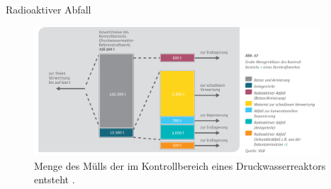 \begin{frame}{Radioaktiver Abfall}
  \begin{figure}
     \centering
     \includegraphics[width=0.95\textwidth]{./bilder/radioakives_material.PNG}
     \caption{Menge des Mülls der im Kontrollbereich eines Druckwasserreaktors entsteht \cite{muell}. }
     \label{ fig: muell_kontrollbereich}
   \end{figure}
\end{frame}



